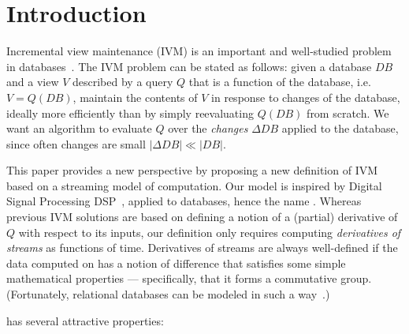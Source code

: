 \section{Introduction}\label{sec:introduction}

Incremental view maintenance (IVM) is an important and well-studied problem in
databases~\cite{gupta-idb95}.  The IVM problem can be stated as follows: given a database $DB$ and
a view $V$ described by a query $Q$ that is a function of the database, i.e. $V = Q(DB)$,
maintain the contents of $V$ in response to changes of the database,
ideally more efficiently than by simply reevaluating $Q(DB)$ from
scratch.  We want an algorithm to evaluate $Q$ over the \emph{changes} $\Delta DB$ applied
to the database, since often changes are small $|\Delta DB| \ll |DB|$.

This paper provides a new perspective by proposing a new definition
of IVM based on a streaming model of computation.  Our model is inspired by Digital Signal
Processing DSP~\cite{rabiner-book75}, applied to databases, hence the name \dbsp.  Whereas previous
IVM solutions are based on defining a notion of a (partial) derivative of $Q$ with respect to its inputs,
our definition only requires computing \emph{derivatives of streams} as functions of time.
Derivatives of streams are always well-defined if the data computed on has a notion of difference
that satisfies some simple mathematical properties --- specifically, that it forms a commutative
group.  (Fortunately, relational databases can be modeled
in such a way~\cite{green-pods07, koch-pods10}.)

\dbsp has several attractive properties:

